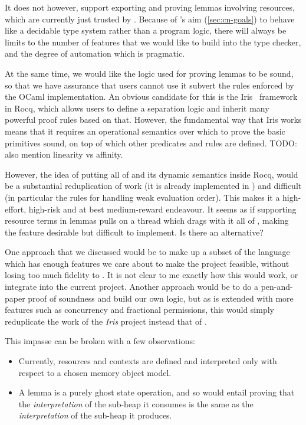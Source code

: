 It does not however, support exporting and proving lemmas involving
resources, which are currently just trusted by . Because of 's
aim (\cref{sec:cn-goals}) to behave like a decidable type system rather than a
program logic, there will always be limits to the number of features that we
would like to build into the type checker, and the degree of automation which
is pragmatic.

At the same time, we would like the logic used for proving lemmas to be sound,
so that we have assurance that users cannot use it subvert the rules enforced
by the OCaml implementation. An obvious candidate for this is the
Iris~ framework in Rocq, which allows users to define a
separation logic and inherit many powerful proof rules based on that. However,
the fundamental way that Iris works means that it requires an operational
semantics over which to prove the basic primitives sound, on top of which other
predicates and rules are defined. TODO\@: also mention linearity vs affinity.

However, the idea of putting all of  and its dynamic semantics inside
Rocq, would be a substantial reduplication of work (it is already
implemented in ) and difficult (in particular the rules for
handling weak evaluation order). This makes it a high-effort, high-risk and at
best medium-reward endeavour. It seems as if supporting resource terms in
lemmas pulls on a thread which drags with it all of , making the
feature desirable but difficult to implement. Is there an alternative?

One approach that we discussed would be to make up a subset of the language
which has enough features we care about to make the project feasible, without
losing too much fidelity to . It is not clear to me exactly how this
would work, or integrate into the current project. Another approach would be to
do a pen-and-paper proof of soundness and build our own logic, but as 
is extended with more features such as concurrency and fractional permissions,
this would simply reduplicate the work of the \emph{Iris} project instead that
of .

This impasse can be broken with a few observations:
\begin{itemize}
    \item Currently, resources and contexts are defined and interpreted only
        with respect to a chosen memory object model.
    \item A lemma is a purely ghost state operation, and so would entail
        proving that the \emph{interpretation} of the sub-heap it consumes is
        the same as the \emph{interpretation} of the sub-heap it produces.
\end{itemize}

